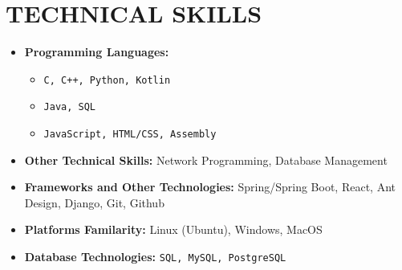 \section{TECHNICAL SKILLS}

\begin{multicols}{2}
  \begin{itemize}[leftmargin=0.25in, itemsep=1pt]
    
    \item \textbf{Programming Languages:} 
      \begin{itemize}[label={-}, leftmargin=0.2in]
        \item \texttt{C, C++, Python, Kotlin}
        \item \texttt{Java, SQL}
        \item \texttt{JavaScript, HTML/CSS, Assembly}
      \end{itemize}
      
    \item \textbf{Other Technical Skills:}
      Network Programming, Database Management
      
  \end{itemize}
  \vspace{\fill}
  \begin{itemize}[leftmargin=0.25in, itemsep=1pt]
    \item \textbf{Frameworks and Other Technologies:}
      Spring/Spring Boot, React, Ant Design, Django, Git, Github
    
    \item \textbf{Platforms Familarity:}
      Linux (Ubuntu), Windows, MacOS
    
    \item \textbf{Database Technologies:} 
      \texttt{SQL, MySQL, PostgreSQL}
  \end{itemize}
\end{multicols}

